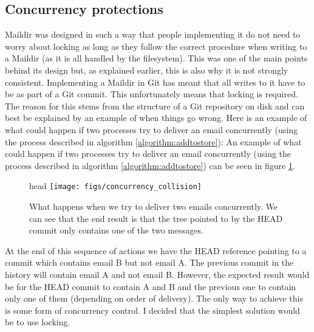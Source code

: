 \subsection{Concurrency protections} \label{section:concurrency}

Maildir was designed in such a way that people implementing it do not need to worry about locking as long as they follow the correct procedure when writing to a Maildir (as it is all handled by the filesystem). This was one of the main points behind its design but, as explained earlier, this is also why it is not strongly consistent. Implementing a Maildir in Git has meant that all writes to it have to be as part of a Git commit. This unfortunately means that locking is required. The reason for this stems from the structure of a Git repository on disk and can best be explained by an example of when things go wrong. Here is an example of what could happen if two processes try to deliver an email concurrently (using the process described in algorithm \ref{algorithm:addtostore}):
An example of what could happen if two processes try to deliver an email concurrently (using the process described in algorithm \ref{algorithm:addtostore}) can be seen in figure \ref{fig:concurrentdeliver}.

\begin{figure}head
  \center
  \texttt{[image: figs/concurrency\_collision]}
  \caption{What happens when we try to deliver two emails concurrently. We can see that the end result is that the tree pointed to by the HEAD commit only contains one of the two messages.}
  \label{fig:concurrentdeliver}
\end{figure}

At the end of this sequence of actions we have the HEAD reference pointing to a commit which contains email B but not email A. The previous commit in the history will contain email A and not email B. However, the expected result would be for the HEAD commit to contain A and B and the previous one to contain only one of them (depending on order of delivery). The only way to achieve this is some form of concurrency control. I decided that the simplest solution would be to use locking.

